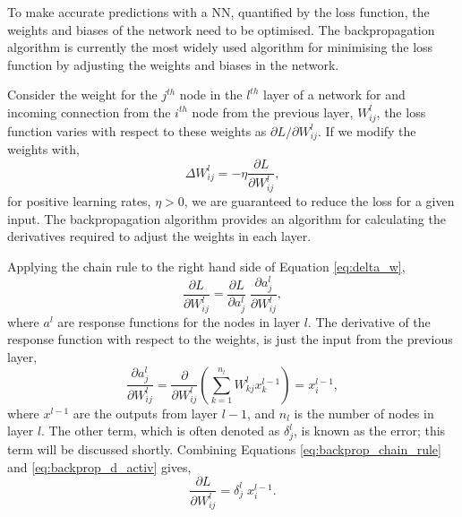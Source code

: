 To make accurate predictions with a NN, quantified by the loss function, the
weights and biases of the network need to be optimised. The backpropagation
algorithm\cite{Rumelhart1986} is currently the most widely used algorithm for
minimising the loss function by adjusting the weights and biases in the network.

Consider the weight for the $j^{th}$ node in the $l^{th}$ layer of a network for
and incoming connection from the $i^{th}$ node from the previous layer, 
$W^l_{ij}$, the loss function varies with respect to these weights as 
$\partial L/\partial W^l_{ ij }$. If we modify the weights with, 
\begin{equation} 
	\Delta W^l_{ ij } = -\eta \frac{\partial L}{\partial W^l_{ ij }},
	\label{eq:delta_w}
\end{equation}
for positive learning rates, $\eta > 0$, we are guaranteed to reduce the loss
for a given input. The backpropagation algorithm provides an algorithm for 
calculating the derivatives required to adjust the weights in each layer.

Applying the chain rule to the right hand side of Equation \ref{eq:delta_w},
\begin{equation}
	\frac{\partial L}{\partial W^l_{ij}} = \frac{\partial L}{\partial a^l_j} \;
	\frac{\partial a^l_j}{\partial W^l_{ij}},
	\label{eq:backprop_chain_rule}
\end{equation}
where $a^l$ are response functions for the nodes in layer $l$. The derivative 
of the response function with respect to the weights, is just the input from the
previous layer,
\begin{equation}
	\frac{\partial a^l_j}{\partial W^l_{ij}} = \frac{\partial}{\partial W^l_{ij}}
	\left( \sum_{k = 1}^{n_l} W^l_{kj} x^{l-1}_{k} \right) = x^{l-1}_i,
	\label{eq:backprop_d_activ}
\end{equation}
where $x^{l-1}$ are the outputs from layer $l-1$, and $n_l$ is the number of 
nodes in layer $l$. The other term, which is often denoted as $\delta^l_j$, is 
known as the error; this term will be discussed shortly. Combining Equations 
\ref{eq:backprop_chain_rule} and \ref{eq:backprop_d_activ} gives,
\begin{equation*}
	\frac{\partial L}{\partial W^l_{ij}} = \delta^l_j \; x^{l-1}_i.
\end{equation*}

